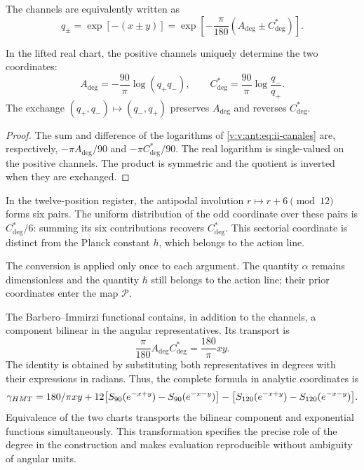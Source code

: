 The channels are equivalently written as
\begin{equation}
 q_\pm=\exp[-(x\pm y)]
 =\exp\!\left[-\frac{\pi}{180}(A_{\deg}\pm C^*_{\deg})\right].
\label{v:v:ant:eq:ii-canales}
\end{equation}
\begin{proposition}
\label{v:v:ant:prop:ii-inversion-canales-angulares} In the lifted real chart, the positive channels uniquely determine the two coordinates:
\[
 A_{\deg}=-\frac{90}{\pi}\log(q_+q_-),\qquad
 C^*_{\deg}=\frac{90}{\pi}\log\frac{q_-}{q_+}.
\]
The exchange \((q_+,q_-)\mapsto(q_-,q_+)\) preserves \(A_{\deg}\) and reverses \(C^*_{\deg}\).
\end{proposition}
\begin{proof}
The sum and difference of the logarithms of \eqref{v:v:ant:eq:ii-canales} are, respectively, \(-\pi A_{\deg}/90\) and \(-\pi C^*_{\deg}/90\). The real logarithm is single-valued on the positive channels. The product is symmetric and the quotient is inverted when they are exchanged.
\end{proof}
In the twelve-position register, the antipodal involution \(r\mapsto r+6\pmod {12}\) forms six pairs. The uniform distribution of the odd coordinate over these pairs is \(C^*_{\deg}/6\): summing its six contributions recovers \(C^*_{\deg}\). This sectorial coordinate is distinct from the Planck constant \(h\), which belongs to the action line.

The conversion is applied only once to each argument. The quantity \(\alpha\) remains dimensionless and the quantity \(\hbar\) still belongs to the action line; their prior coordinates enter the map \(\mathcal P\).

The Barbero--Immirzi functional contains, in addition to the channels, a component bilinear in the angular representatives. Its transport is
\begin{equation}
 \frac{\pi}{180}A_{\deg}C^*_{\deg}
 =\frac{180}{\pi}xy.
 \label{v:v:ant:eq:ii-barbero-cartas}
\end{equation}
The identity is obtained by substituting both representatives in degrees with their expressions in radians. Thus, the complete formula in analytic coordinates is
\[
 \gamma_{HMT}
 =180/\pi xy
 +12\bigl[S_{90}(e^{-x+y})-S_{90}(e^{-x-y})\bigr]
 -\bigl[S_{120}(e^{-x+y})-S_{120}(e^{-x-y})\bigr].
\]
Equivalence of the two charts transports the bilinear component and exponential functions simultaneously. This transformation specifies the precise role of the degree in the construction and makes evaluation reproducible without ambiguity of angular units.
